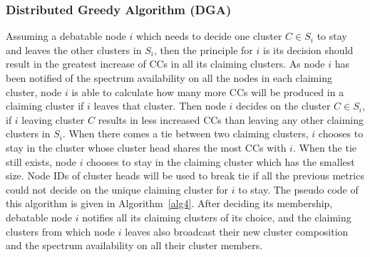 \documentclass[times]{ettauth}
\newcommand{\ie}{i.e., }
\theoremstyle{mytheoremstyle}
\theoremstyle{mytheoremstyle}
\theoremstyle{mytheoremstyle}
\begin{document}

\subsubsection{Distributed Greedy Algorithm (DGA)}
Assuming a debatable node $i$ which needs to decide one cluster $C\in S_i$ to stay and leaves the other clusters in $S_i$, then the principle for $i$ is its decision should result in the greatest increase of CCs in all its claiming clusters.
As node $i$ has been notified of the spectrum availability on all the nodes in each claiming cluster, node $i$ is able to calculate how many more CCs will be produced in a claiming cluster if $i$ leaves that cluster.
Then node $i$ decides on the cluster $C\in S_i$, if $i$ leaving cluster $C$ results in less increased CCs than leaving any other claiming clusters in $S_i$.
When there comes a tie between two claiming clusters, $i$ chooses to stay in the cluster whose cluster head shares the most CCs with $i$.
When the tie still exists, node $i$ chooses to stay in the claiming cluster which has the smallest size.
Node IDs of cluster heads will be used to break tie if all the previous metrics could not decide on the unique claiming cluster for $i$ to stay.
The pseudo code of this algorithm is given in Algorithm~\ref{alg4}.
After deciding its membership, debatable node $i$ notifies all its claiming clusters of its choice, and the claiming clusters from which node $i$ leaves also broadcast their new cluster composition and the spectrum availability on all their cluster members.
\end{document}
